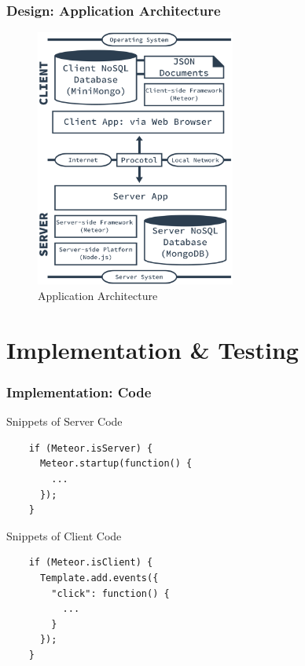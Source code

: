 \documentclass[10pt, compress]{beamer}
\begin{document}
\begin{frame}[fragile]
  \frametitle{Design: Application Architecture}

  \begin{figure}[ht]
    \centering
    \vspace{-25pt}
    \includegraphics[height=8.5cm]{include/satellid-app-arch.png}
    \vspace{-10pt}
    \caption{Application Architecture}
    \label{fig:satellid-app-arch}
  \end{figure}

\end{frame}


\section{Implementation \& Testing}


\begin{frame}[fragile]
  \frametitle{Implementation: Code}

  Snippets of Server Code
  \begin{verbatim}
    if (Meteor.isServer) {
      Meteor.startup(function() {
        ...
      });
    }
  \end{verbatim}

  Snippets of Client Code
  \begin{verbatim}
    if (Meteor.isClient) {
      Template.add.events({
        "click": function() {
          ...
        }
      });
    }
  \end{verbatim}

\end{frame}
\end{document}
